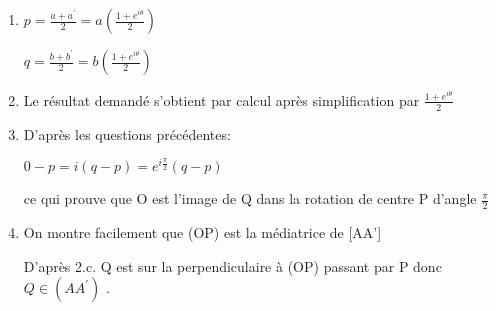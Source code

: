 \begin{corrige}
\begin{enumerate}
\begin{enumerate}[label=\alph*.]
               \item
               $p=\frac{a+a^{\prime}}{2}=a\left(\frac{1 +e^{i\theta }}{2}\right)$
               \par
               $q=\frac{b+b^{\prime}}{2}=b\left(\frac{1 +e^{i\theta }}{2}\right)$
               \item
               Le résultat demandé s'obtient par calcul après simplification par $\frac{1 +e^{i\theta }}{2}$
               \item
               D'après les questions précédentes:
               \par
               $0-p=i\left(q-p\right)=e^{i\frac{\pi }{2}}\left(q-p\right)$
               \par
               ce qui prouve que O est l'image de Q dans la rotation de centre P d'angle $\frac{\pi }{2}$
               \item
               On montre facilement que (OP) est la médiatrice de [AA']
               \par
               D'après 2.c. Q est sur la perpendiculaire à (OP) passant par P donc $Q\in \left(AA^{\prime}\right)$
               .
          \end{enumerate}
     \end{enumerate}
\end{corrige}

